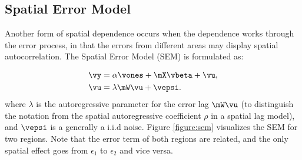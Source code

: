 \documentclass[english,12pt]{book}\usepackage[]{graphicx}\usepackage[]{xcolor}
\begin{document}
% 

\subsection{Spatial Error Model}\label{sec:tax_SEM}

Another form of spatial dependence occurs when the dependence works through the error process, in that the errors from different areas may display spatial autocorrelation. The Spatial Error Model (SEM) is formulated as:

\begin{equation}\label{eq:sem_model_comp}
  \begin{aligned}
\vy &= \alpha \vones + \mX\vbeta + \vu, \\
\vu &= \lambda \mW\vu + \vepsi. \\
 \end{aligned}
\end{equation}
%
where $\lambda$ is the autoregressive parameter for the error lag $\mW\vu$ (to distinguish the notation from the spatial autoregressive coefficient $\rho$ in a spatial lag model), and $\vepsi$ is a generally a i.i.d noise. Figure \ref{figure:sem} visualizes the SEM for two regions. Note that the error term of both regions are related, and the only spatial effect goes from $\epsilon_1$ to $\epsilon_2$ and vice versa. 	
\end{document}
